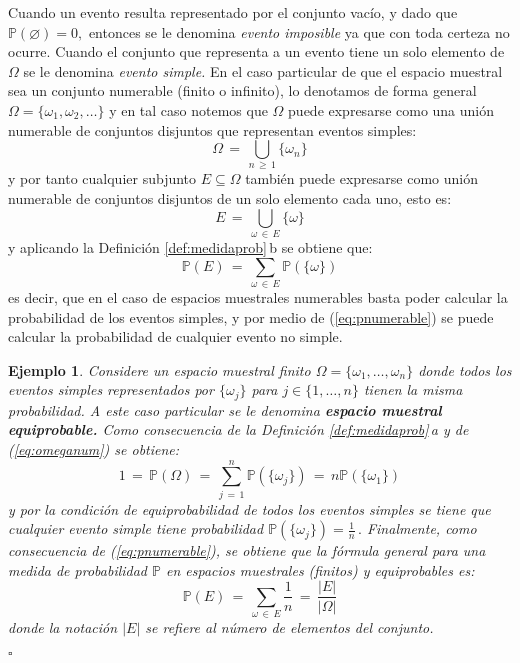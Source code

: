 \documentclass[spanish,10pt,letterpaper]{article}
\newtheorem{ejem}{Ejemplo}
\newcommand{\prob}{\mathbb{P}}
\newcommand{\qed}{\begin{flushright}$\square$\end{flushright}}
\begin{document}
	Cuando un evento resulta representado por el conjunto vacío, y dado que $\prob(\varnothing)=0,$ entonces se le denomina \textit{evento imposible} ya que con toda certeza no ocurre. Cuando el conjunto que representa a un evento tiene un solo elemento de $\Omega$ se le denomina \textit{evento simple.} En el caso particular de que el espacio muestral sea un conjunto numerable (finito o infinito), lo denotamos de forma general $\Omega=\{\omega_1,\omega_2,\ldots\}$ y en tal caso notemos que $\Omega$ puede expresarse como una unión numerable de conjuntos disjuntos que representan eventos simples:
	\begin{equation}\label{eq:omeganum}
		\Omega \,=\, \bigcup_{n\,\geq\,1}\{\omega_n\}
	\end{equation}
	y por tanto cualquier subjunto $E\subseteq\Omega$ también puede expresarse como unión numerable de conjuntos disjuntos de un solo elemento cada uno, esto es: $$E \,=\, \bigcup_{\omega\,\in\,E}\{\omega\}$$ y aplicando la Definición \ref{def:medidaprob}\,b se obtiene que: 
	\begin{equation}\label{eq:pnumerable}
		\prob(E) \,=\, \sum_{\omega\,\in\,E}\prob(\{\omega\})
	\end{equation}
	es decir, que en el caso de espacios muestrales numerables basta poder calcular la probabilidad de los eventos simples, y por medio de (\ref{eq:pnumerable}) se puede calcular la probabilidad de cualquier evento no simple.
	
	\bigskip 
	
	\begin{ejem}\label{ej:equiprob}
		Considere un espacio muestral finito $\Omega=\{\omega_1,\ldots,\omega_n\}$ donde todos los eventos simples representados por $\{\omega_j\}$ para $j\in\{1,\ldots,n\}$ tienen la misma probabilidad. A este caso particular se le denomina \textbf{espacio muestral equiprobable.} Como consecuencia de la Definición \ref{def:medidaprob}\,a y de (\ref{eq:omeganum}) se obtiene:
		$$1 \,=\, \prob(\Omega) \,=\, \sum_{j\,=\,1}^{n}\prob(\{\omega_j\}) \,=\, n\prob(\{\omega_1\})$$
		y por la condición de equiprobabilidad de todos los eventos simples se tiene que cualquier evento simple tiene probabilidad $\prob(\{\omega_j\})=\frac{1}{n}\,.$ Finalmente, como consecuencia de (\ref{eq:pnumerable}), se obtiene que la fórmula general para una medida de probabilidad $\prob$ en espacios muestrales (finitos) y equiprobables es:
		\begin{equation}\label{eq:equiprob}
			\prob(E) \,=\, \sum_{\omega\,\in\,E}\frac{1}{n} \,=\, \frac{|E|}{|\Omega|}
		\end{equation}
		donde la notación $|E|$ se refiere al número de elementos del conjunto. \qed
	\end{ejem}
	
\end{document}
